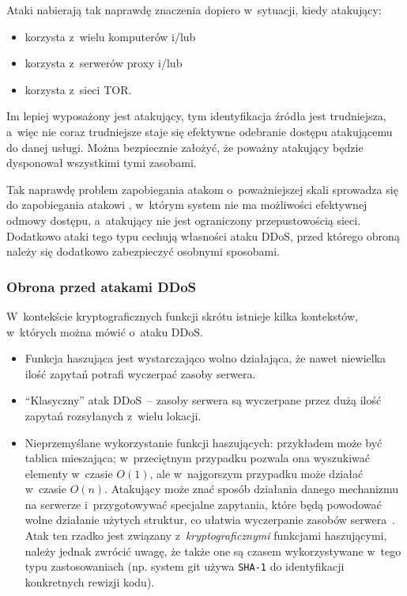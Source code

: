 Ataki  nabierają tak naprawdę znaczenia dopiero w~sytuacji, kiedy
atakujący:

\begin{itemize}

\item korzysta z~wielu komputerów i/lub
\item korzysta z~serwerów proxy i/lub
\item korzysta z~sieci TOR.

\end{itemize}

Im lepiej wyposażony jest atakujący, tym identyfikacja źródła jest trudniejsza,
a~więc nie coraz trudniejsze staje się efektywne odebranie dostępu atakującemu
do danej usługi. Można bezpiecznie założyć, że poważny atakujący będzie
dysponował wszystkimi tymi zasobami.

Tak naprawdę problem zapobiegania atakom o~poważniejszej skali sprowadza się do
zapobiegania atakowi , w~którym system nie ma możliwości efektywnej
odmowy dostępu, a~atakujący nie jest ograniczony przepustowością sieci.
Dodatkowo ataki tego typu cechują własności ataku DDoS, przed którego obroną
należy się dodatkowo zabezpieczyć osobnymi sposobami.

\subsubsection{Obrona przed atakami DDoS}
W~kontekście kryptograficznych funkcji skrótu istnieje kilka kontekstów,
w~których można mówić o~ataku DDoS.

\begin{itemize}

\item Funkcja haszująca jest wystarczająco wolno działająca, że nawet niewielka
ilość zapytań potrafi wyczerpać zasoby serwera.

\item ``Klasyczny'' atak DDoS~-- zasoby serwera są wyczerpane przez dużą ilość
zapytań rozsyłanych z~wielu lokacji.

\item Nieprzemyślane wykorzystanie funkcji haszujących: przykładem może być
tablica mieszająca; w~przeciętnym przypadku pozwala ona wyszukiwać elementy
w~czasie $O(1)$, ale w~najgorszym przypadku może działać w~czasie $O(n)$.
Atakujący może znać sposób działania danego mechanizmu na serwerze
i~przygotowywać specjalne zapytania, które będą powodować wolne działanie
użytych struktur, co ułatwia wyczerpanie zasobów serwera~\cite{ddos_hashes}.
Atak ten rzadko jest związany z~\emph{kryptograficznymi} funkcjami haszującymi,
należy jednak zwrócić uwagę, że także one są czasem wykorzystywane w~tego typu
zastosowaniach (np. system git używa \texttt{SHA-1} do identyfikacji
konkretnych rewizji kodu).

\end{itemize}

